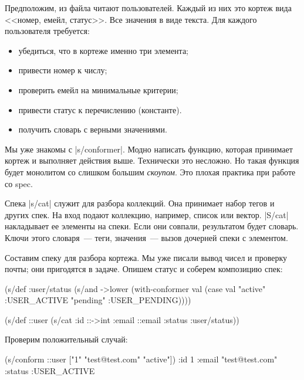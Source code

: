 Предположим, из файла читают пользователей. Каждый из них это кортеж вида
<<номер, емейл, статус>>. Все значения в виде текста. Для каждого пользователя
требуется:

\begin{itemize}

\item
  убедиться, что в кортеже именно три элемента;

\item
  привести номер к числу;

\item
  проверить емейл на минимальные критерии;

\item
  привести статус к перечислению (константе).

\item
  получить словарь с верными значениями.

\end{itemize}

Мы уже знакомы с \spverb|s/conformer|. Модно написать функцию, которая принимает
кортеж и выполняет действия выше. Технически это несложно. Но такая функция
будет монолитом со слишком большим \emph{скоупом}. Это плохая практика при
работе со spec.

Спека \spverb|s/cat| служит для разбора коллекций. Она принимает набор тегов и
других спек. На вход подают коллекцию, например, список или
вектор. \spverb|S/cat| накладывает ее элементы на спеки. Если они совпали,
результатом будет словарь. Ключи этого словаря~--- теги, значения~--- вызов
дочерней спеки с элементом.

Составим спеку для разбора кортежа. Мы уже писали вывод чисел и проверку почты;
они пригодятся в задаче. Опишем статус и соберем композицию спек:

\begin{english}
  \begin{clojure}
(s/def :user/status
  (s/and ->lower
         (with-conformer val
           (case val
             "active"  :USER_ACTIVE
             "pending" :USER_PENDING))))

(s/def ::user
  (s/cat :id ::->int
         :email ::email
         :status :user/status))
  \end{clojure}
\end{english}

\noindent
Проверим положительный случай:

\begin{english}
  \begin{clojure}
(s/conform ::user ["1" "test@test.com" "active"])
{:id 1
 :email "test@test.com"
 :status :USER_ACTIVE}
  \end{clojure}
\end{english}

